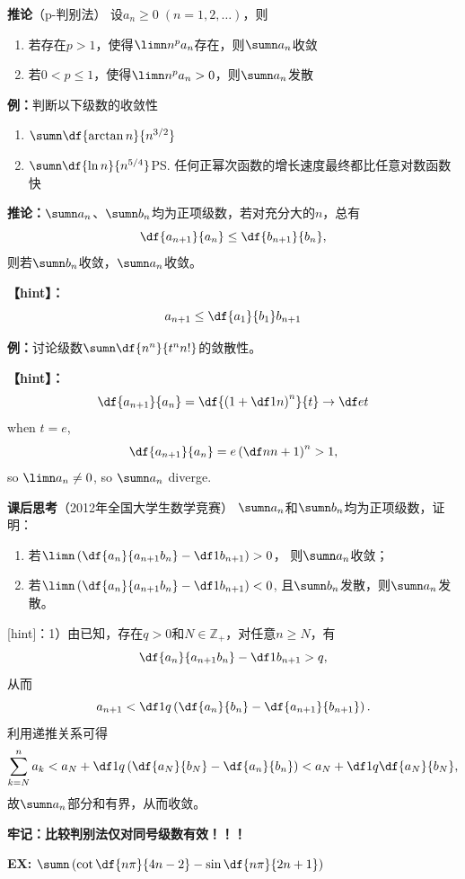 {\bf 推论}（p-判别法）
设$a_n\geq 0\;(n=1,2,\ldots)$，则 
\begin{enumerate}
  \setlength{\itemindent}{1cm}
  \item 若存在$p>1$，使得$\limn n^pa_n$存在，则$\sumn a_n$收敛 
  \item 若$0<p\leq 1$，使得$\limn n^pa_n>0$，则$\sumn a_n$发散
\end{enumerate}

{\bf 例：}判断以下级数的收敛性
\begin{enumerate}[(1)]
  \setlength{\itemindent}{1cm}
  \item $\sumn\df{\arctan n}{n^{3/2}}$
  \item $\sumn\df{\ln n}{n^{5/4}}$\ps{任何正幂次函数的增长速度最终都比任意对数函数快}
\end{enumerate}

{\bf 推论：}$\sumn a_n$、$\sumn b_n$均为正项级数，若对充分大的$n$，总有
$$\df{a_{n+1}}{a_n}\leq\df{b_{n+1}}{b_n},$$
则若$\sumn b_n$收敛，$\sumn a_n$收敛。

{\bf 【hint】：}
$$a_{n+1}\leq\df{a_1}{b_1}b_{n+1}$$

{\bf 例：}讨论级数$\sumn\df{n^n}{t^nn!}$的敛散性。

{\bf 【hint】：}
$$\df{a_{n+1}}{a_n}=\df{\left(1+\df1n\right)^n}{t}\to\df et$$
when $t=e$, 
$$\df{a_{n+1}}{a_n}=e\left(\df n{n+1}\right)^n>1,$$
so $\limn a_n\ne 0$, so $\sumn a_n$ diverge.

{\bf 课后思考}（2012年全国大学生数学竞赛）
$\sumn a_n$和$\sumn b_n$均为正项级数，证明：
\begin{enumerate}
  \setlength{\itemindent}{1cm}
  \item 若$\limn\left(\df{a_n}{a_{n+1}b_n}-\df 1{b_{n+1}}\right)>0$，
  则$\sumn a_n$收敛；
  \item 若$\limn\left(\df{a_n}{a_{n+1}b_n}-\df 1{b_{n+1}}\right)<0$,
  且$\sumn b_n$发散，则$\sumn a_n$发散。
\end{enumerate}

[hint]：1）由已知，存在$q>0$和$N\in\mathbb{Z}_+$，对任意$n\geq N$，有
$$\df{a_n}{a_{n+1}b_n}-\df 1{b_{n+1}}>q,$$
从而
$$a_{n+1}<\df1q\left(\df{a_n}{b_n}-\df{a_{n+1}}{b_{n+1}}\right).$$
利用递推关系可得
$$\sum\limits_{k=N}^na_k<a_N+\df1q\left(\df{a_N}{b_N}-\df{a_n}{b_n}\right)
<a_N+\df1q\df{a_N}{b_N},$$
故$\sumn a_n$部分和有界，从而收敛。

{\bf 牢记：比较判别法仅对同号级数有效！！！}

{\bf EX:} $\sumn\left(\cot\df{n\pi}{4n-2}-\sin\df{n\pi}{2n+1}\right)$

